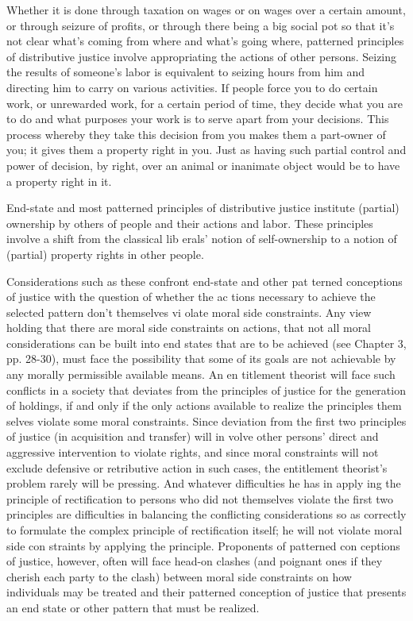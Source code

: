 \documentclass[11pt,openany]{book}
\begin{document}
Whether it is done through taxation on wages or on wages over a certain amount, or through seizure of profits, or through there being a big social pot so that it's not clear what's coming from where and what's going where, patterned principles of distributive justice involve appropriating the actions of other persons. Seizing the results of someone's labor is equivalent to seizing hours from him and directing him to carry on various activities. If people force you to do certain work, or unrewarded work, for a certain period of time, they decide what you are to do and what purposes your work is to serve apart from your decisions. This process whereby they take this decision from you makes them a part-owner of you; it gives them a property right in you. Just as having such partial control and power of decision, by right, over an animal or inanimate object would be to have a property right in it. 

End-state and most patterned principles of distributive justice institute (partial) ownership by others of people and their actions and labor. These principles involve a shift from the classical lib erals' notion of self-ownership to a notion of (partial) property rights in other people. 

Considerations such as these confront end-state and other pat terned conceptions of justice with the question of whether the ac tions necessary to achieve the selected pattern don't themselves vi olate moral side constraints. Any view holding that there are moral side constraints on actions, that not all moral considerations can be built into end states that are to be achieved (see Chapter 3, pp. 28-30), must face the possibility that some of its goals are not achievable by any morally permissible available means. An en titlement theorist will face such conflicts in a society that deviates from the principles of justice for the generation of holdings, if and only if the only actions available to realize the principles them selves violate some moral constraints. Since deviation from the first two principles of justice (in acquisition and transfer) will in volve other persons' direct and aggressive intervention to violate rights, and since moral constraints will not exclude defensive or retributive action in such cases, the entitlement theorist's problem rarely will be pressing. And whatever difficulties he has in apply ing the principle of rectification to persons who did not themselves violate the first two principles are difficulties in balancing the conflicting considerations so as correctly to formulate the complex principle of rectification itself; he will not violate moral side con straints by applying the principle. Proponents of patterned con ceptions of justice, however, often will face head-on clashes (and poignant ones if they cherish each party to the clash) between moral side constraints on how individuals may be treated and their patterned conception of justice that presents an end state or other pattern that must be realized. 
\end{document}
